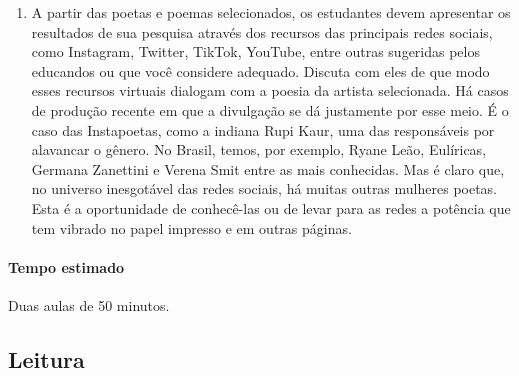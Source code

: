 \documentclass[12pt]{extarticle}
\begin{document}
\begin{enumerate}
\item A partir das poetas e poemas selecionados, os estudantes devem
apresentar os resultados de sua pesquisa através dos recursos das
principais redes sociais, como Instagram, Twitter, TikTok, YouTube,
entre outras sugeridas pelos educandos ou que você considere adequado.
Discuta com eles de que modo esses recursos virtuais dialogam com a
poesia da artista selecionada. Há casos de produção recente em que a
divulgação se dá justamente por esse meio. É o caso das Instapoetas,
como a indiana Rupi Kaur, uma das responsáveis por alavancar o gênero.
No Brasil, temos, por exemplo, Ryane Leão, Eulíricas, Germana Zanettini
e Verena Smit entre as mais conhecidas. Mas é claro que, no universo
inesgotável das redes sociais, há muitas outras mulheres poetas. Esta é
a oportunidade de conhecê-las ou de levar para as redes a potência que
tem vibrado no papel impresso e em outras páginas.
\end{enumerate}

\paragraph{Tempo estimado} Duas aulas de 50 minutos.

\subsection{Leitura}

\end{document}
